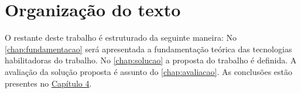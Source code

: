 \section{Organização do texto}

O restante deste trabalho é estruturado da seguinte maneira: No \autoref{chap:fundamentacao} será apresentada a fundamentação teórica das tecnologias habilitadoras do trabalho. No \autoref{chap:solucao} a proposta do trabalho é definida. A avaliação da solução proposta é assunto do \autoref{chap:avaliacao}. As conclusões estão presentes no \underline{Capítulo 4}.

